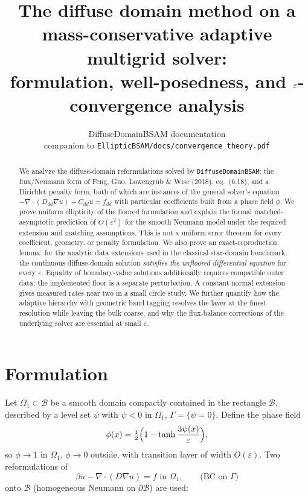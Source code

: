 \documentclass[11pt]{article}
\title{The diffuse domain method on a mass-conservative adaptive
multigrid solver:\\ formulation, well-posedness, and
$\eps$-convergence analysis}
\author{DiffuseDomainBSAM documentation\\[2pt]
\small companion to \texttt{EllipticBSAM/docs/convergence\_theory.pdf}}
\date{}
\theoremstyle{remark}
\newcommand{\dive}{\nabla\!\cdot\!}
\newcommand{\eps}{\varepsilon}
\newcommand{\B}{\mathcal{B}}
\begin{document}
\maketitle

\begin{abstract}
We analyze the diffuse-domain reformulations solved by
\texttt{DiffuseDomainBSAM}: the flux/Neumann form of Feng, Guo,
Lowengrub \& Wise (2018), eq.~(6.18), and a Dirichlet penalty form, both
of which are instances of the general solver's equation
$-\dive(D_{dd}\nabla u)+C_{dd}u=f_{dd}$ with particular coefficients
built from a phase field $\phi$.  We prove uniform ellipticity of the
floored formulation and explain the formal matched-asymptotic prediction
of $O(\eps^2)$ for the smooth Neumann model under the required extension
and matching assumptions. This is not a uniform error theorem for every
coefficient, geometry, or penalty formulation. We also prove an
exact-reproduction lemma: for the analytic data extensions used in the
classical star-domain benchmark, the continuous diffuse-domain solution
\emph{satisfies the unfloored differential equation} for every $\eps$.
Equality of boundary-value solutions additionally requires compatible
outer data; the implemented floor is a separate perturbation. A
constant-normal extension gives measured rates near two in a small
circle study. We further quantify how the adaptive
hierarchy with
geometric band tagging resolves the layer at the finest resolution
while leaving the bulk coarse, and why the flux-balance corrections of
the underlying solver are essential at small $\eps$.
\end{abstract}

\section{Formulation}

Let $\Omega_1\subset\B$ be a smooth domain compactly contained in the
rectangle $\B$, described by a level set $\psi$ with $\psi<0$ in
$\Omega_1$, $\Gamma=\{\psi=0\}$.  Define the phase field
\begin{equation}\label{eq:phi}
  \phi(x) = \tfrac12\Bigl(1-\tanh\frac{3\psi(x)}{\eps}\Bigr),
\end{equation}
so $\phi\to 1$ in $\Omega_1$, $\phi\to0$ outside, with transition layer
of width $O(\eps)$.  Two reformulations of
\begin{equation}\label{eq:sharp}
  \beta u-\dive(D\nabla u)=f \text{ in }\Omega_1,
  \qquad\text{(BC on }\Gamma\text{)}
\end{equation}
onto $\B$ (homogeneous Neumann on $\partial\B$) are used:
\end{document}
